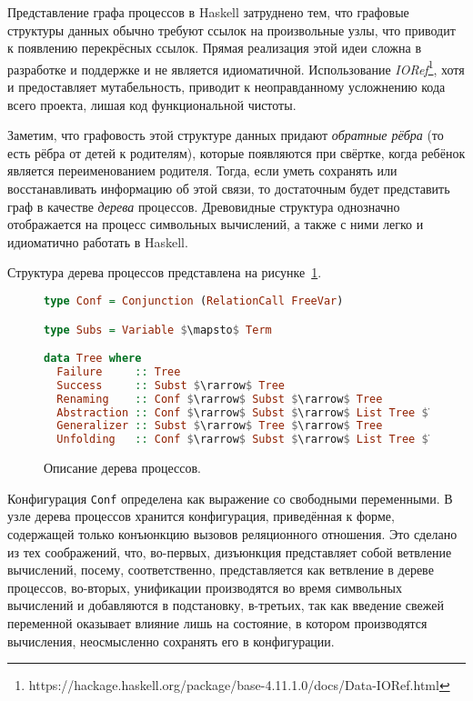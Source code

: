 
Представление графа процессов в Haskell затруднено тем, что графовые
структуры данных обычно требуют ссылок на произвольные узлы,
что приводит к появлению перекрёсных ссылок. Прямая реализация этой
идеи сложна в разработке и поддержке и не является идиоматичной.
Использование \emph{IORef}\footnote{https://hackage.haskell.org/package/base-4.11.1.0/docs/Data-IORef.html},
хотя и предоставляет мутабельность, приводит к неоправданному усложнению кода всего проекта,
лишая код функциональной чистоты.

Заметим, что графовость этой структуре данных придают \emph{обратные рёбра}
(то есть рёбра от детей к родителям), которые появляются при свёртке, когда ребёнок
является переименованием родителя.
Тогда, если уметь сохранять или восстанавливать информацию об этой связи, то
достаточным будет представить граф в качестве \emph{дерева} процессов.
Древовидные структура однозначно отображается на процесс символьных вычислений,
а также с ними легко и идиоматично работать в Haskell.

Структура дерева процессов представлена на рисунке~\ref{fig:ptree}.

\begin{figure}[h!]
\begin{lstlisting}[mathescape,language=Haskell,extendedchars=\true,frame=single,basicstyle=\ttfamily]
type Conf = Conjunction (RelationCall FreeVar)

type Subs = Variable $\mapsto$ Term

data Tree where
  Failure     :: Tree
  Success     :: Subst $\rarrow$ Tree
  Renaming    :: Conf $\rarrow$ Subst $\rarrow$ Tree
  Abstraction :: Conf $\rarrow$ Subst $\rarrow$ List Tree $\rarrow$ Tree
  Generalizer :: Subst $\rarrow$ Tree $\rarrow$ Tree
  Unfolding   :: Conf $\rarrow$ Subst $\rarrow$ List Tree $\rarrow$ Tree
\end{lstlisting}
\caption{Описание дерева процессов.}
\label{fig:ptree}
\end{figure}

Конфигурация \lstinline{Conf} определена как выражение со свободными переменными.
В узле дерева процессов хранится конфигурация, приведённая к форме, содержащей только конъюнкцию вызовов
реляционного отношения. Это сделано из тех соображений, что, во-первых, дизъюнкция представляет
собой ветвление вычислений, посему, соответственно, представляется как ветвление в дереве процессов,
во-вторых, унификации производятся во время символьных вычислений и добавляются в подстановку,
в-третьих, так как введение свежей переменной оказывает влияние лишь на состояние, в котором производятся вычисления,
неосмысленно сохранять его в конфигурации.

